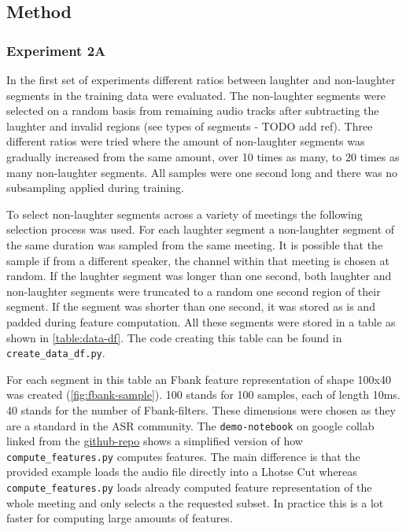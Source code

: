 \documentclass[bsc,frontabs,parskip,deptreport]{infthesis}
\newcommand{\coderepo}{\href{https://github.com/LasseWolter/laughter-detection-icsi}{github-repo} }
\begin{document}
\subsection{Method}
\subsubsection{Experiment 2A}
In the first set of experiments different ratios between laughter and non-laughter segments in the training data were evaluated. 
The non-laughter segments were selected on a random basis from remaining audio tracks after subtracting the laughter and invalid regions (see types of segments - TODO add ref). 
Three different ratios were tried where the amount of non-laughter segments was gradually increased from the same amount, over 10 times as many, to 20 times as many non-laughter segments.
All samples were one second long and there was no subsampling applied during training.

To select non-laughter segments across a variety of meetings the following selection process was used.
For each laughter segment a non-laughter segment of the same duration was sampled from the same meeting. It is possible that the sample if from a different speaker, the channel within that meeting is chosen at random.
If the laughter segment was longer than one second, both laughter and non-laughter segments were truncated to a random one second region of their segment. 
If the segment was shorter than one second, it was stored as is and padded during feature computation.
All these segments were stored in a table as shown in \autoref{table:data-df}.
The code creating this table can be found in \verb|create_data_df.py|. 

For each segment in this table an Fbank feature representation of shape 100x40 was created (\autoref{fig:fbank-sample}). 100 stands for 100 samples, each of length 10ms. 40 stands for the number of Fbank-filters. These dimensions were chosen as they are a standard in the ASR community.
The \texttt{demo-notebook} on google collab linked from the \coderepo shows a simplified version of how \verb|compute_features.py| computes features. 
The main difference is that the provided example loads the audio file directly into a Lhotse Cut whereas \verb|compute_features.py| loads already computed feature representation of the whole meeting and only selects a the requested subset. In practice this is a lot faster for computing large amounts of features.
\end{document}
